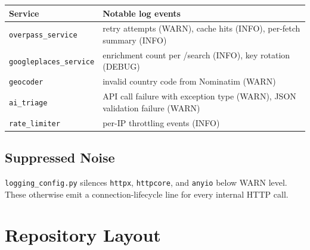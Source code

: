 \documentclass[11pt, a4paper]{article}
\newcommand{\file}[1]{\texttt{\small\color{rsblue}#1}}
\newcommand{\code}[1]{\texttt{\small#1}}
\begin{document}
\begin{tabularx}{\textwidth}{l X}
\toprule
\textbf{Service} & \textbf{Notable log events} \\
\midrule
\code{overpass\_service} & retry attempts (WARN), cache hits (INFO), per-fetch summary (INFO) \\
\code{googleplaces\_service} & enrichment count per /search (INFO), key rotation (DEBUG) \\
\code{geocoder} & invalid country code from Nominatim (WARN) \\
\code{ai\_triage} & API call failure with exception type (WARN), JSON validation failure (WARN) \\
\code{rate\_limiter} & per-IP throttling events (INFO) \\
\bottomrule
\end{tabularx}

\subsection{Suppressed Noise}

\file{logging\_config.py} silences \code{httpx}, \code{httpcore}, and \code{anyio} below WARN level. These otherwise emit a connection-lifecycle line for every internal HTTP call.

\section{Repository Layout}
\end{document}
